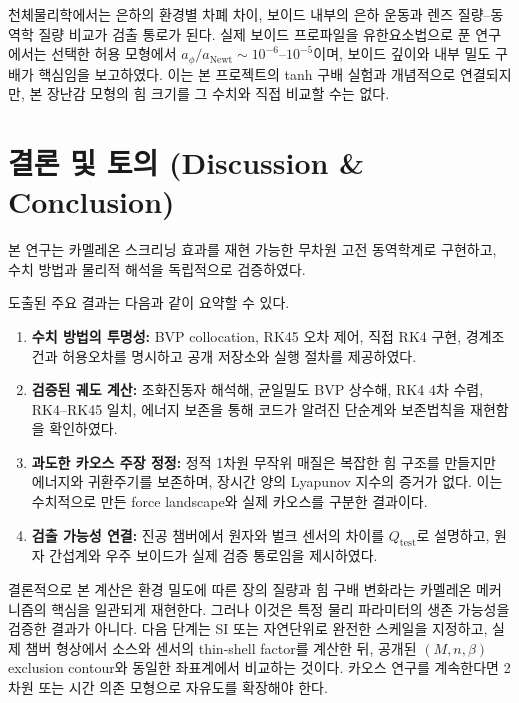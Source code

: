 \documentclass[11pt, a4paper]{article}
\begin{document}
천체물리학에서는 은하의 환경별 차폐 차이, 보이드 내부의 은하 운동과 렌즈 질량--동역학 질량 비교가 검출 통로가 된다. 실제 보이드 프로파일을 유한요소법으로 푼 연구에서는 선택한 허용 모형에서 $a_{\phi}/a_{\mathrm{Newt}}\sim10^{-6}$--$10^{-5}$이며, 보이드 깊이와 내부 밀도 구배가 핵심임을 보고하였다\cite{Tamosiunas2022}. 이는 본 프로젝트의 tanh 구배 실험과 개념적으로 연결되지만, 본 장난감 모형의 힘 크기를 그 수치와 직접 비교할 수는 없다.

\section{결론 및 토의 (Discussion \& Conclusion)}

본 연구는 카멜레온 스크리닝 효과를 재현 가능한 무차원 고전 동역학계로 구현하고, 수치 방법과 물리적 해석을 독립적으로 검증하였다.

도출된 주요 결과는 다음과 같이 요약할 수 있다.
\begin{enumerate}
    \item \textbf{수치 방법의 투명성:} BVP collocation, RK45 오차 제어, 직접 RK4 구현, 경계조건과 허용오차를 명시하고 공개 저장소와 실행 절차를 제공하였다.
    \item \textbf{검증된 궤도 계산:} 조화진동자 해석해, 균일밀도 BVP 상수해, RK4 4차 수렴, RK4--RK45 일치, 에너지 보존을 통해 코드가 알려진 단순계와 보존법칙을 재현함을 확인하였다.
    \item \textbf{과도한 카오스 주장 정정:} 정적 1차원 무작위 매질은 복잡한 힘 구조를 만들지만 에너지와 귀환주기를 보존하며, 장시간 양의 Lyapunov 지수의 증거가 없다. 이는 수치적으로 만든 force landscape와 실제 카오스를 구분한 결과이다.
    \item \textbf{검출 가능성 연결:} 진공 챔버에서 원자와 벌크 센서의 차이를 $Q_{\mathrm{test}}$로 설명하고, 원자 간섭계와 우주 보이드가 실제 검증 통로임을 제시하였다.
\end{enumerate}

결론적으로 본 계산은 환경 밀도에 따른 장의 질량과 힘 구배 변화라는 카멜레온 메커니즘의 핵심을 일관되게 재현한다. 그러나 이것은 특정 물리 파라미터의 생존 가능성을 검증한 결과가 아니다. 다음 단계는 SI 또는 자연단위로 완전한 스케일을 지정하고, 실제 챔버 형상에서 소스와 센서의 thin-shell factor를 계산한 뒤, 공개된 $(M,n,\beta)$ exclusion contour와 동일한 좌표계에서 비교하는 것이다. 카오스 연구를 계속한다면 2차원 또는 시간 의존 모형으로 자유도를 확장해야 한다.
\end{document}
